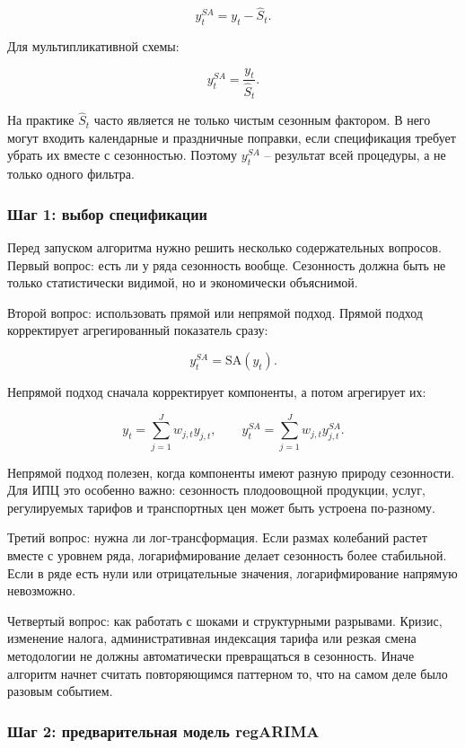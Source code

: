 \documentclass[12pt,fleqn]{article}
\begin{document}
\[
y_t^{SA}
=
y_t-\hat S_t.
\]

Для мультипликативной схемы:

\[
y_t^{SA}
=
\frac{y_t}{\hat S_t}.
\]

На практике \(\hat S_t\) часто является не только чистым сезонным фактором.
В него могут входить календарные и праздничные поправки, если спецификация требует убрать их вместе с сезонностью.
Поэтому \(y_t^{SA}\) -- результат всей процедуры, а не только одного фильтра.

\subsubsection{Шаг 1: выбор спецификации}

Перед запуском алгоритма нужно решить несколько содержательных вопросов.
Первый вопрос: есть ли у ряда сезонность вообще.
Сезонность должна быть не только статистически видимой, но и экономически объяснимой.

Второй вопрос: использовать прямой или непрямой подход.
Прямой подход корректирует агрегированный показатель сразу:

\[
y_t^{SA}
=
\mathrm{SA}(y_t).
\]

Непрямой подход сначала корректирует компоненты, а потом агрегирует их:

\[
y_t
=
\sum_{j=1}^{J} w_{j,t} y_{j,t},
\qquad
y_t^{SA}
=
\sum_{j=1}^{J} w_{j,t} y_{j,t}^{SA}.
\]

Непрямой подход полезен, когда компоненты имеют разную природу сезонности.
Для ИПЦ это особенно важно: сезонность плодоовощной продукции, услуг, регулируемых тарифов и транспортных цен может быть устроена по-разному.

Третий вопрос: нужна ли лог-трансформация.
Если размах колебаний растет вместе с уровнем ряда, логарифмирование делает сезонность более стабильной.
Если в ряде есть нули или отрицательные значения, логарифмирование напрямую невозможно.

Четвертый вопрос: как работать с шоками и структурными разрывами.
Кризис, изменение налога, административная индексация тарифа или резкая смена методологии не должны автоматически превращаться в сезонность.
Иначе алгоритм начнет считать повторяющимся паттерном то, что на самом деле было разовым событием.

\subsubsection{Шаг 2: предварительная модель regARIMA}
\end{document}
